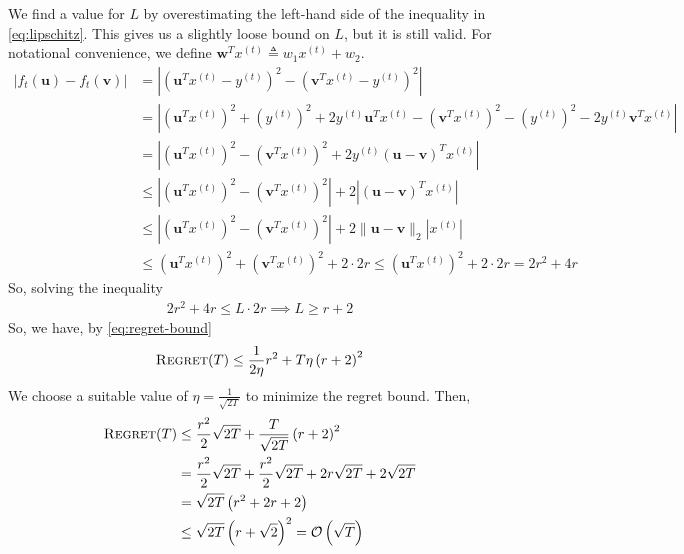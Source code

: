\documentclass[11pt]{article}
\newcommand{\bigO}{{\cal O}}
\begin{document}
We find a value for $L$ by overestimating the left-hand side of the inequality in \eqref{eq:lipschitz}. This
gives us a slightly loose bound on $L$, but it is still valid. For notational convenience, we define
$\mathbf{w}^{T} x^{(t)}\triangleq w_{1} x^{(t)} + w_{2}$.
\begin{align}
    | f_{t}(\mathbf{u}) - f_{t}(\mathbf{v}) | &= \left| \left( \mathbf{u}^{T} x^{(t)} - y^{(t)} \right)^{2} - \left( \mathbf{v}^{T} x^{(t)} - y^{(t)} \right)^{2} \right| \\
    &= \left| \left( \mathbf{u}^{T} x^{(t)} \right)^{2} + \left( y^{(t)} \right)^{2} + 2 y^{(t)} \mathbf{u}^{T} x^{(t)}
            - \left( \mathbf{v}^{T} x^{(t)} \right)^{2} - \left( y^{(t)} \right)^{2} - 2 y^{(t)} \mathbf{v}^{T} x^{(t)} \right| \\
    &= \left| \left( \mathbf{u}^{T} x^{(t)} \right)^{2} - \left( \mathbf{v}^{T} x^{(t)} \right)^{2} + 2 y^{(t)} (\mathbf{u} - \mathbf{v})^{T} x^{(t)} \right| \\
    &\leq \left| \left( \mathbf{u}^{T} x^{(t)} \right)^{2} - \left( \mathbf{v}^{T} x^{(t)} \right)^{2} \right| + 2 \left| (\mathbf{u} - \mathbf{v})^{T} x^{(t)} \right| \\
    &\leq \left| \left( \mathbf{u}^{T} x^{(t)} \right)^{2} - \left( \mathbf{v}^{T} x^{(t)} \right)^{2} \right| + 2 \lVert \mathbf{u} - \mathbf{v} \rVert_{2} \left| x^{(t)} \right| \\
    &\leq \left( \mathbf{u}^{T} x^{(t)} \right)^{2} + \left( \mathbf{v}^{T} x^{(t)} \right)^{2} + 2 \cdot 2r
    \leq \left( \mathbf{u}^{T} x^{(t)} \right)^{2} + 2 \cdot 2r = 2r^{2} + 4r
\end{align}
So, solving the inequality
\begin{align}
    2r^{2} + 4r \leq L \cdot 2r \implies L \geq r + 2
\end{align}
So, we have, by \eqref{eq:regret-bound}
\begin{equation}
    \textsc{Regret}(T) \leq \frac{1}{2\eta} r^{2} + T \eta \left( r + 2 \right)^{2}
\end{equation}
We choose a suitable value of $\eta = \frac{1}{\sqrt{2T}}$ to minimize the regret bound. Then,
\begin{align}
    \textsc{Regret}(T) &\leq \frac{r^{2}}{2} \sqrt{2T} + \frac{T}{\sqrt{2T}} \left( r + 2 \right)^{2} \\
    &= \frac{r^{2}}{2} \sqrt{2T} + \frac{r^{2}}{2} \sqrt{2T} + 2r \sqrt{2T} + 2 \sqrt{2T} \\
    &= \sqrt{2T} \left( r^{2} + 2r + 2 \right) \\
    &\leq \sqrt{2T} \left( r + \sqrt{2} \right)^{2} = \bigO \left( \sqrt{T} \right)
\end{align}
\end{document}
